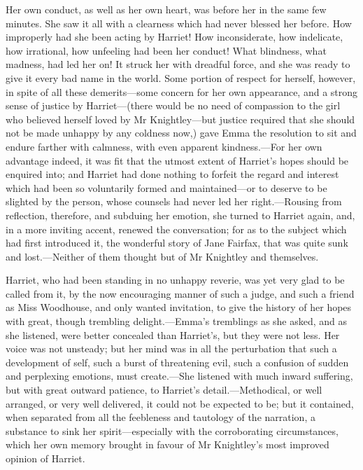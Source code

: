 Her own conduct, as well as her own heart, was before her in the same few minutes. She saw it all with a clearness which had never blessed her before. How improperly had she been acting by Harriet! How inconsiderate, how indelicate, how irrational, how unfeeling had been her conduct! What blindness, what madness, had led her on! It struck her with dreadful force, and she was ready to give it every bad name in the world. Some portion of respect for herself, however, in spite of all these demerits—some concern for her own appearance, and a strong sense of justice by Harriet—(there would be no need of compassion to the girl who believed herself loved by Mr Knightley—but justice required that she should not be made unhappy by any coldness now,) gave Emma the resolution to sit and endure farther with calmness, with even apparent kindness.—For her own advantage indeed, it was fit that the utmost extent of Harriet's hopes should be enquired into; and Harriet had done nothing to forfeit the regard and interest which had been so voluntarily formed and maintained—or to deserve to be slighted by the person, whose counsels had never led her right.—Rousing from reflection, therefore, and subduing her emotion, she turned to Harriet again, and, in a more inviting accent, renewed the conversation; for as to the subject which had first introduced it, the wonderful story of Jane Fairfax, that was quite sunk and lost.—Neither of them thought but of Mr Knightley and themselves.

Harriet, who had been standing in no unhappy reverie, was yet very glad to be called from it, by the now encouraging manner of such a judge, and such a friend as Miss Woodhouse, and only wanted invitation, to give the history of her hopes with great, though trembling delight.—Emma's tremblings as she asked, and as she listened, were better concealed than Harriet's, but they were not less. Her voice was not unsteady; but her mind was in all the perturbation that such a development of self, such a burst of threatening evil, such a confusion of sudden and perplexing emotions, must create.—She listened with much inward suffering, but with great outward patience, to Harriet's detail.—Methodical, or well arranged, or very well delivered, it could not be expected to be; but it contained, when separated from all the feebleness and tautology of the narration, a substance to sink her spirit—especially with the corroborating circumstances, which her own memory brought in favour of Mr Knightley's most improved opinion of Harriet.

